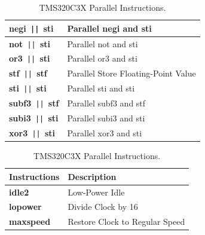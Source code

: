 \begin{table}[!p]
\begin{center}
\begin{tabular}{|p{3.0cm}|p{10.0cm}|}
	\hline
	\textbf{negi}\texttt{~||~}\textbf{sti} & Parallel negi and sti\\
	\hline
	\textbf{not}\texttt{~||~}\textbf{sti} & Parallel not and sti\\
	\hline
	\textbf{or3}\texttt{~||~}\textbf{sti} & Parallel or3 and sti\\
	\hline
	\textbf{stf}\texttt{~||~}\textbf{stf} & Parallel Store Floating-Point Value\\
	\hline
	\textbf{sti}\texttt{~||~}\textbf{sti} & Parallel sti and sti\\
	\hline
	\textbf{subf3}\texttt{~||~}\textbf{stf} & Parallel subf3 and stf\\
	\hline
	\textbf{subi3}\texttt{~||~}\textbf{sti} & Parallel subi3 and sti\\
	\hline
	\textbf{xor3}\texttt{~||~}\textbf{sti} & Parallel xor3 and sti\\
	\hline
	\end{tabular}
	\caption{\label{table:tms320c3x_parallel_instructions} TMS320C3X Parallel Instructions.}
\end{center}
\end{table}

\begin{table}[!p]
\begin{center}
	\small
	\begin{tabular}{|p{3.0cm}|p{10.0cm}|}
	\hline
	\textbf{Instructions} & \textbf{Description}\\
	\hline
	\textbf{idle2} & Low-Power Idle\\
	\hline
	\textbf{lopower} & Divide Clock by 16\\
	\hline
	\textbf{maxspeed} & Restore Clock to Regular Speed\\
	\hline
	\end{tabular}
	\caption{\label{table:tms320c3x_power_instructions} TMS320C3X Parallel Instructions.}
\end{center}
\end{table}

